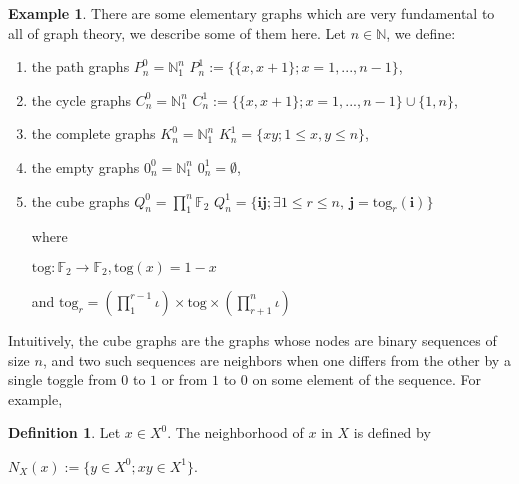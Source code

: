 \documentclass[]{article}
\theoremstyle{definition}
\newtheorem{definition}{Definition}[section]
\theoremstyle{definition}
\newtheorem{exmp}{Example}[section]
\newcommand{\raw}{\rightarrow}
\newcommand{\bb}{\mathbb}
\begin{document}
	\begin{exmp}
		There are some elementary graphs which are very fundamental to all of graph theory, we describe some of them here. Let $n \in \bb{N}$, we define:
		
		\begin{enumerate}
			\item  the path graphs
			\subitem $P_n^0 = \bb{N}^n_1$
			\subitem $P_n^1 := \{\{x,x+1\}; x = 1, ..., n-1\}$,
			
			\item the cycle graphs
			\subitem $C_n^0 = \bb{N}^n_1$
			\subitem $C_n^1 := \{\{x,x+1\}; x = 1, ..., n-1\} \cup \{1, n\}$,
			
			\item the complete graphs
			\subitem $K_n^0 = \bb{N}^n_1$
			\subitem $K_n^1 = \{xy; 1 \leq x,y \leq n \}$,
			
			\item the empty graphs
			\subitem $0_n^0 = \bb{N}^n_1$
			\subitem $0_n^1 = \emptyset$,
			
			\item the cube graphs
			\subitem $Q_n^0 = \prod_{1}^{n} \bb{F}_2$
			\subitem $Q_n^1 = \{\textbf{i}\textbf{j}; \exists 1\leq r\leq n, \ \textbf{j}=\text{tog}_r(\textbf{i})\}$
			
			\noindent where 
			
			\begin{center}
				$\text{tog}:\bb{F}_2 \raw \bb{F}_2, \text{tog}(x) = 1-x$ 
				
				and $\text{tog}_r = (\prod_1^{r-1}\iota) \times \text{tog} \times (\prod_{r+1}^n \iota)$
			\end{center}
			
		\end{enumerate}
		
	\end{exmp}
	
	Intuitively, the cube graphs are the graphs whose nodes are binary sequences of size $n$, and two such sequences are neighbors when one differs from the other by a single toggle from $0$ to $1$ or from $1$ to $0$ on some element of the sequence. For example, 
	
	\begin{definition}
		Let $x \in X^0$. The neighborhood of $x$ in $X$ is defined by 
		
		\begin{center}
			$N_X(x) := \{y \in X^0; xy \in X^1 \}$.
		\end{center}
	\end{definition}
	
\end{document}
